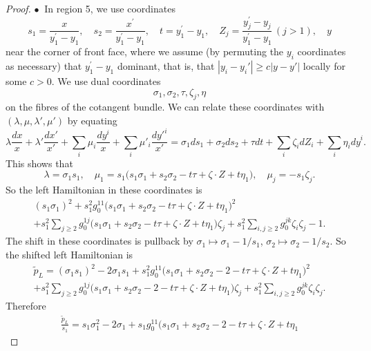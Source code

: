 \documentclass[10pt, a4paper, twoside]{amsart}
\numberwithin{equation}{section}
\theoremstyle{remark}
\begin{document}
\begin{proof}
$\bullet \ $ In region 5, we use coordinates
$$
s_1 = \frac{x}{y_1^\prime - y_1}, \quad s_2 = \frac{x^\prime}{y_1^\prime - y_1}, \quad t = y_1^\prime - y_1,\quad Z_j = \frac{y_j^\prime - y_j}{y_1^\prime - y_1} \, (j > 1), \quad y
$$
near the corner of front face,  where we assume (by permuting the $y_i$ coordinates as necessary) that  $y_1^\prime - y_1$ dominant, that is, that $|y_i - y_i'| \geq c |y- y'|$ locally for some $c > 0$. We use dual coordinates
$$
\sigma_1, \sigma_2, \tau, \zeta_j, \eta
$$
on the fibres of the cotangent bundle. We can relate these coordinates with $(\lambda, \mu, \lambda', \mu')$ by equating
$$
\lambda \frac{dx}{x} + \lambda' \frac{dx'}{x'} + \sum_i \mu_i \frac{dy^i}{x} + \sum_i \mu'_i \frac{{dy'}^i}{x'}=
\sigma_1 ds_1  + \sigma_2 ds_2  + \tau dt +  \sum_i \zeta_i dZ_i + \sum_i \eta_i {dy}^i .
$$
This shows that
$$
\lambda = \sigma_1 s_1, \quad \mu_1 = s_1 \big( s_1 \sigma_1  + s_2 \sigma_2  - t \tau +  \zeta \cdot Z +  t \eta_1 \big) , \quad
\mu_j = - s_1 \zeta_j .
$$
So the left Hamiltonian in these coordinates is
\begin{equation}\begin{gathered}
(s_1 \sigma_1 )^2 + s_1^2 g_0^{11} \big(s_1 \sigma_1  + s_2 \sigma_2  - t \tau +  \zeta \cdot Z +  t \eta_1\big)^2 \\ + s_1^2 \sum_{j \geq 2} g_0^{1j} \big( s_1 \sigma_1  + s_2 \sigma_2  - t \tau +  \zeta \cdot Z +  t \eta_1 \big)  \zeta_j + s_1^2 \sum_{i, j \geq 2} g_0^{jk} \zeta_i \zeta_j - 1.
\end{gathered}\end{equation}
The shift in these coordinates is pullback by $\sigma_1 \mapsto \sigma_1 - 1/s_1$,  $\sigma_2 \mapsto \sigma_2 - 1/s_2$. So the shifted left Hamiltonian is
\begin{equation}\begin{gathered}
{\tilde p_L} = (\sigma_1 s_1)^2 - 2 \sigma_1 s_1 + s_1^2 g_0^{11} \big(s_1 \sigma_1  + s_2 \sigma_2 -2 - t \tau +  \zeta \cdot Z +  t \eta_1
\big)^2 \\ + s_1^2 \sum_{j \geq 2} g_0^{1j} \big(s_1 \sigma_1  + s_2 \sigma_2 -2 - t \tau +  \zeta \cdot Z +  t \eta_1 \big)  \zeta_j + s_1^2 \sum_{i, j \geq 2} g_0^{jk} \zeta_i \zeta_j.
\end{gathered}\label{shifted-Ham-r5} \end{equation}
Therefore
\begin{equation}\begin{gathered}
\frac{\tilde p_L}{s_1}  = s_1\sigma_1^2 - 2 \sigma_1  + s_1 g_0^{11} \big(s_1 \sigma_1  + s_2 \sigma_2 -2 - t \tau +  \zeta \cdot Z +  t \eta_1

\end{gathered}
\end{equation}
\end{proof}
\end{document}
